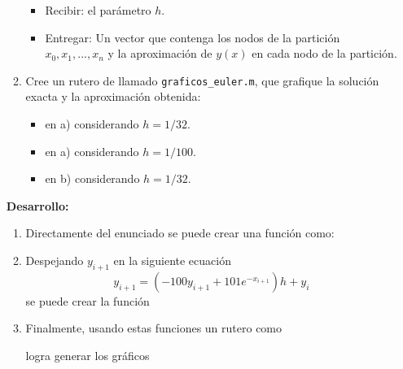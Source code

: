 \documentclass[letter,11pt]{article}
\begin{document}
\begin{enumerate}
\begin{enumerate}
\begin{itemize}
\item Recibir: el par\'ametro  $h$.
\item Entregar: Un vector que contenga los nodos de la partici\'on $x_0, x_1, ..., x_n$ y la aproximaci\'on de $y(x)$ en cada nodo de la partici\'on.
\end{itemize}

\item  Cree un rutero de \octave llamado \texttt{graficos\_euler.m}, que grafique la soluci\'on exacta y la aproximaci\'on obtenida:
\begin{itemize}
\item en a) considerando $h = 1/32$. 
\item en a) considerando $h = 1/100$. 
\item en b) considerando $h = 1/32$. 
\end{itemize}
\end{enumerate}
\textbf{Desarrollo:}

\begin{enumerate}
    \item Directamente del enunciado se puede crear una funci\'on como:
    
    
    \hfill{}
    \item Despejando $y_{i+1}$ en la siguiente ecuaci\'on
    $$
    y_{i+1}=(-100y_{i+1}+101e^{-x_{i+1}})h+y_i
    $$
    se puede crear la funci\'on 
    
    
    \hfill{}
    
    \item Finalmente, usando estas funciones un rutero como
    
    
    \hfill{}
    logra generar los gr\'aficos
\end{enumerate}

\end{enumerate}
\end{document}
